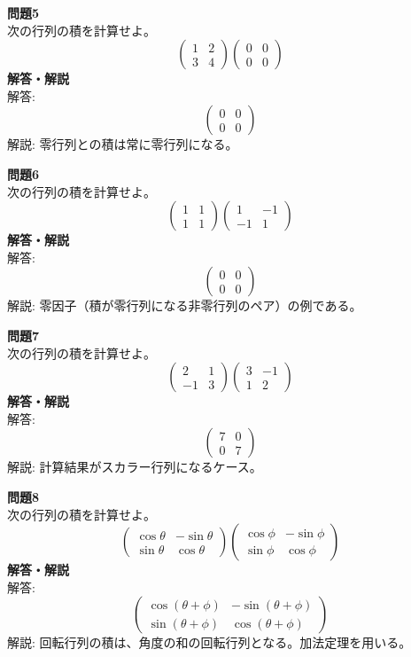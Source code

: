 \documentclass[a4paper,dvipdfmx]{jsarticle}
\begin{document}
\textbf{問題5}\\
次の行列の積を計算せよ。
$$ \begin{pmatrix} 1 & 2 \\ 3 & 4 \end{pmatrix} \begin{pmatrix} 0 & 0 \\ 0 & 0 \end{pmatrix} $$
\textbf{解答・解説}\\
解答: $$ \begin{pmatrix} 0 & 0 \\ 0 & 0 \end{pmatrix} $$
解説: 零行列との積は常に零行列になる。

\textbf{問題6}\\
次の行列の積を計算せよ。
$$ \begin{pmatrix} 1 & 1 \\ 1 & 1 \end{pmatrix} \begin{pmatrix} 1 & -1 \\ -1 & 1 \end{pmatrix} $$
\textbf{解答・解説}\\
解答: $$ \begin{pmatrix} 0 & 0 \\ 0 & 0 \end{pmatrix} $$
解説: 零因子（積が零行列になる非零行列のペア）の例である。

\textbf{問題7}\\
次の行列の積を計算せよ。
$$ \begin{pmatrix} 2 & 1 \\ -1 & 3 \end{pmatrix} \begin{pmatrix} 3 & -1 \\ 1 & 2 \end{pmatrix} $$
\textbf{解答・解説}\\
解答: $$ \begin{pmatrix} 7 & 0 \\ 0 & 7 \end{pmatrix} $$
解説: 計算結果がスカラー行列になるケース。

\textbf{問題8}\\
次の行列の積を計算せよ。
$$ \begin{pmatrix} \cos\theta & -\sin\theta \\ \sin\theta & \cos\theta \end{pmatrix} \begin{pmatrix} \cos\phi & -\sin\phi \\ \sin\phi & \cos\phi \end{pmatrix} $$
\textbf{解答・解説}\\
解答: $$ \begin{pmatrix} \cos(\theta+\phi) & -\sin(\theta+\phi) \\ \sin(\theta+\phi) & \cos(\theta+\phi) \end{pmatrix} $$
解説: 回転行列の積は、角度の和の回転行列となる。加法定理を用いる。
\end{document}
